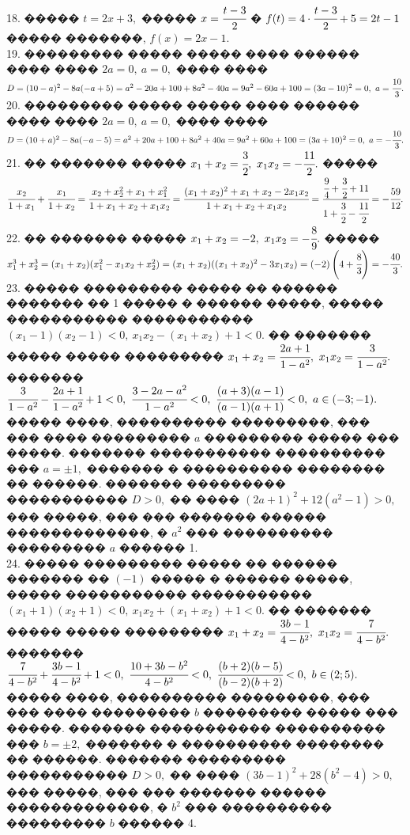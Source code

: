 \documentclass[12pt]{article}
\begin{document}
18. ����� $t=2x+3,$ ����� $x=\cfrac{t-3}{2}$ � $f(t)=4\cdot\cfrac{t-3}{2}+5=2t-1$ ����� �������, $f(x)=2x-1.$\\
19. ��������� ����� ����� ���� ������ ���� ���� $2a=0,\ a=0,$ ���� ���� $D=(10-a)^2-8a(-a+5)=a^2-20a+100+8a^2-40a=9a^2-60a+100=(3a-10)^2=0,\ a=\cfrac{10}{3}.$\\
20. ��������� ����� ����� ���� ������ ���� ���� $2a=0,\ a=0,$ ���� ���� $D=(10+a)^2-8a(-a-5)=a^2+20a+100+8a^2+40a=9a^2+60a+100=(3a+10)^2=0,\ a=-\cfrac{10}{3}.$\\
21. �� ������� ����� $x_1+x_2=\cfrac{3}{2},\ x_1x_2=-\cfrac{11}{2}.$ ����� $\cfrac{x_2}{1+x_1}+\cfrac{x_1}{1+x_2}=\cfrac{x_2+x_2^2+x_1+x_1^2}{1+x_1+x_2+x_1x_2}=
\cfrac{(x_1+x_2)^2+x_1+x_2-2x_1x_2}{1+x_1+x_2+x_1x_2}=\cfrac{\cfrac{9}{4}+\cfrac{3}{2}+11}{1+\cfrac{3}{2}-\cfrac{11}{2}}=-\cfrac{59}{12}.$\\
22. �� ������� ����� $x_1+x_2=-2,\ x_1x_2=-\cfrac{8}{9}.$ ����� $x_1^3+x_2^3=(x_1+x_2)(x_1^2-x_1x_2+x_2^2)=(x_1+x_2)((x_1+x_2)^2-3x_1x_2)=(-2)\left(4+\cfrac{8}{3}\right)=-\cfrac{40}{3}.$\\
23. ����� ��������� ����� �� ������ ������� �� 1 ����� � ������ �����, ����� ����������� ����������� $(x_1-1)(x_2-1)<0,\ x_1x_2-(x_1+x_2)+1<0.$ �� ������� ����� ����� ��������� $x_1+x_2=\cfrac{2a+1}{1-a^2},\ x_1x_2=\cfrac{3}{1-a^2}.$ ������� $\cfrac{3}{1-a^2}-\cfrac{2a+1}{1-a^2}+1<0,\
\cfrac{3-2a-a^2}{1-a^2}<0,\ \cfrac{(a+3)(a-1)}{(a-1)(a+1)}<0,\ a\in(-3;-1).$ ����� ����, ���������� ���������, ��� ��� ���� ��������� $a$ ��������� ����� ��� �����. ������� ����������� ���������� ��� $a=\pm1,$ ������� � ���������� �������� �� ������. ������� ��������� ����������� $D>0,$ �� ���� $(2a+1)^2+12(a^2-1)>0,$ ��� �����, ��� ��� ������� ������ �������������, � $a^2$ ��� ���������� ��������� $a$ ������ 1.\\
24. ����� ��������� ����� �� ������ ������� �� $(-1)$ ����� � ������ �����, ����� ����������� ����������� $(x_1+1)(x_2+1)<0,\ x_1x_2+(x_1+x_2)+1<0.$ �� ������� ����� ����� ��������� $x_1+x_2=\cfrac{3b-1}{4-b^2},\ x_1x_2=\cfrac{7}{4-b^2}.$ ������� $\cfrac{7}{4-b^2}+\cfrac{3b-1}{4-b^2}+1<0,\
\cfrac{10+3b-b^2}{4-b^2}<0,\ \cfrac{(b+2)(b-5)}{(b-2)(b+2)}<0,\ b\in(2;5).$ ����� ����, ���������� ���������, ��� ��� ���� ��������� $b$ ��������� ����� ��� �����. ������� ����������� ���������� ��� $b=\pm2,$ ������� � ���������� �������� �� ������. ������� ��������� ����������� $D>0,$ �� ���� $(3b-1)^2+28(b^2-4)>0,$ ��� �����, ��� ��� ������� ������ �������������, � $b^2$ ��� ���������� ��������� $b$ ������ 4.\\
\end{document}
